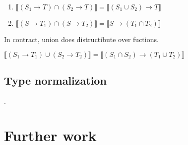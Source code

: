 \documentclass[acmsmall,review,screen]{acmart}
\newcommand{\fun}{\mathbin{\rightarrow}}
\newcommand{\sem}[1]{\llbracket{#1}\rrbracket}
\begin{document}
\begin{lemma} \mbox{}
  \begin{enumerate}
  \item $\sem{(S_1 \fun T) \cap (S_2 \fun T)} =
    \sem{(S_1 \cup S_2) \fun T}$
  \item $\sem{(S \fun T_1) \cap (S \fun T_2)} =
   \sem{S \fun (T_1 \cap T_2)}$
  \end{enumerate}
\end{lemma}

In contract, union does distructibute over fuctions.

\begin{lemma}
  $\sem{(S_1 \fun T_1) \cup (S_2 \fun T_2)} =
   \sem{(S_1 \cap S_2) \fun (T_1 \cup T_2)}$
\end{lemma}

\subsection{Type normalization}
\label{subsec:typnorm}.
  
\section{Further work}



\end{document}
